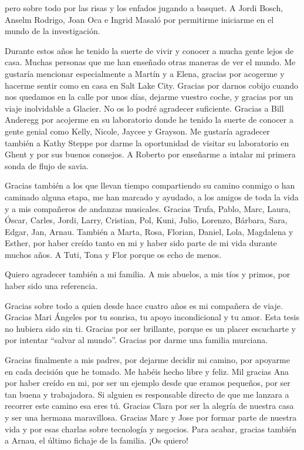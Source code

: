 \documentclass[11pt,twoside]{reedthesis}
\begin{document}
\begin{acknowledgements}
    pero sobre todo por las risas y los enfados jugando a basquet. A Jordi
    Bosch, Anselm Rodrigo, Joan Oca e Ingrid Masaló por permitirme iniciarme
    en el mundo de la investigación.\par
    Durante estos años he tenido la suerte de vivir y conocer a mucha gente
    lejos de casa. Muchas personas que me han enseñado otras maneras de ver
    el mundo. Me gustaría mencionar especialmente a Martín y a Elena,
    gracias por acogerme y hacerme sentir como en casa en Salt Lake City.
    Gracias por darnos cobijo cuando nos quedamos en la calle por unos días,
    dejarme vuestro coche, y gracias por un viaje inolvidable a Glacier. No
    os lo podré agradecer suficiente. Gracias a Bill Anderegg por acojerme
    en su laboratorio donde he tenido la suerte de conocer a gente genial
    como Kelly, Nicole, Jaycee y Grayson. Me gustaría agradecer también a
    Kathy Steppe por darme la oportunidad de visitar su laboratorio en Ghent
    y por sus buenos consejos. A Roberto por enseñarme a intalar mi primera
    sonda de flujo de savia.\par
    Gracias también a los que llevan tiempo compartiendo su camino conmigo o
    han caminado alguna etapa, me han marcado y ayudado, a los amigos de
    toda la vida y a mis compañeros de andanzas musicales. Gracias Trufa,
    Pablo, Marc, Laura, Óscar, Carles, Jordi, Larry, Cristian, Pol, Kuni,
    Julio, Lorenzo, Bárbara, Sara, Edgar, Jan, Arnau. También a Marta, Rosa,
    Florian, Daniel, Lola, Magdalena y Esther, por haber creído tanto en mi
    y haber sido parte de mi vida durante muchos años. A Tuti, Tona y Flor
    porque os echo de menos.\par
    Quiero agradecer también a mi familia. A mis abuelos, a mis tíos y
    primos, por haber sido una referencia.\par
    Gracias sobre todo a quien desde hace cuatro años es mi compañera de
    viaje. Gracias Mari Ángeles por tu sonrisa, tu apoyo incondicional y tu
    amor. Esta tesis no hubiera sido sin ti. Gracias por ser brillante,
    porque es un placer escucharte y por intentar ``salvar al mundo''.
    Gracias por darme una familia murciana.\par
    Gracias finalmente a mis padres, por dejarme decidir mi camino, por
    apoyarme en cada decisión que he tomado. Me habéis hecho libre y feliz.
    Mil gracias Ana por haber creído en mi, por ser un ejemplo desde que
    eramos pequeños, por ser tan buena y trabajadora. Si alguien es
    responsable directo de que me lanzara a recorrer este camino esa eres
    tú. Gracias Clara por ser la alegría de nuestra casa y ser una hermana
    maravillosa. Gracias Marc y Jose por formar parte de nuestra vida y por
    esas charlas sobre tecnología y negocios. Para acabar, gracias también a
    Arnau, el último fichaje de la familia. ¡Os quiero!\par
  \end{acknowledgements}
\end{document}
